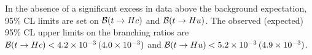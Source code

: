In the absence of a significant excess in data above the background expectation, 95\% CL limits are set on $\mathcal{B}(t\to Hc)$ and $\mathcal{B}(t\to Hu)$.
The observed (expected) 95\% CL upper limits on the branching ratios 
are $\mathcal{B}(t\to Hc)<4.2 \times 10^{-3}\,(4.0 \times 10^{-3})$ and $\mathcal{B}(t\to Hu)<5.2 \times 10^{-3}\,(4.9 \times 10^{-3})$.

%
%
